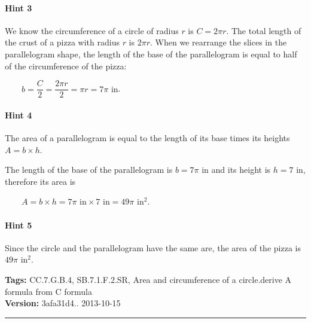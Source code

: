 \documentclass[twocolumn,10pt]{article}
\begin{document}
\paragraph{Hint 3}We know the circumference of a circle of radius $r$ is $C=2\pi r$. The total length of the crust of a pizza with radius $r$ is $2\pi r$. When we rearrange the slices in the parallelogram shape, the length of the base of the parallelogram is equal to half of the circumference of the pizza:

$\qquad b = \dfrac{C}{2} = \dfrac{ 2 \pi r }{2}= \pi r=7\pi\text{ in}$.


\paragraph{Hint 4}The area of a parallelogram is equal to the length of its base times its heights $A=b\times h$.

The length of the base of the parallelogram is $b=7\pi\text{ in}$ and its height is $h=7\text{ in}$, therefore its area is 

$\qquad A= b \times h = 7\pi\text{ in}\times 7\text{ in} = 49\pi\text{ in}^2$.


\paragraph{Hint 5}Since the circle and the parallelogram have the same are, the area of the pizza is $49\pi\text{ in}^2$.




\medskip
\noindent
\textbf{Tags:} {\footnotesize CC.7.G.B.4, SB.7.1.F.2.SR, Area and circumference of a circle.derive A formula from C formula}\\
\textbf{Version:} 3afa31d4.. 2013-10-15
\smallskip\hrule
\end{document}
